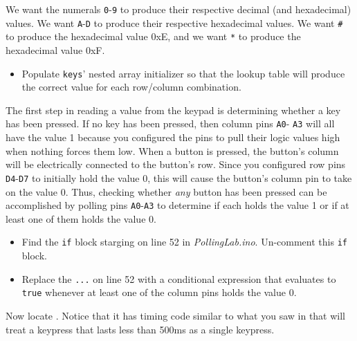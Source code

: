 We want the numerals \texttt{0}-\texttt{9} to produce their respective decimal
(and hexadecimal) values. We want \texttt{A}-\texttt{D} to produce their
respective hexadecimal values. We want \texttt{#} to produce the hexadecimal
value 0xE, and we want \texttt{*} to produce the hexadecimal value 0xF.

    \begin{itemize}
    \item Populate \lstinline{keys}' nested array initializer so that the
        lookup table will produce the correct value for each row/column
        combination.
    \end{itemize}

The first step in reading a value from the keypad is determining whether a key
has been pressed. If no key has been pressed, then column pins \texttt{A0}-
\texttt{A3} will all have the value 1 because you configured the pins to pull
their logic values high when nothing forces them low. When a button is pressed,
the button's column will be electrically connected to the button's row. Since
you configured row pins \texttt{D4}-\texttt{D7} to initially hold the value 0,
this will cause the button's column pin to take on the value 0. Thus, checking
whether \textit{any} button has been pressed can be accomplished by polling
pins \texttt{A0}-\texttt{A3} to determine if each holds the value 1 or if at
least one of them holds the value 0.

    \begin{itemize}
    \item Find the \lstinline{if} block starging on line 52 in
        \textit{PollingLab.ino}. Un-comment this \lstinline{if} block.
    \item Replace the \lstinline{...} on line 52 with a conditional expression
        that evaluates to \texttt{true} whenever at least one of the column
        pins holds the value 0.
    \end{itemize}

Now locate . Notice that it has timing code similar
to what you saw in  that will treat a keypress that
lasts less than 500ms as a single keypress.

